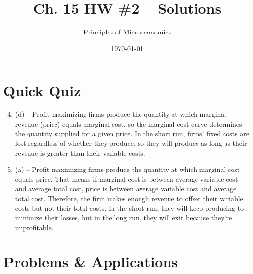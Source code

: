 \documentclass{article}
\title{Ch. 15 HW \#2 -- Solutions}
\author{Principles of Microeconomics}
\date{\today}
\begin{document}
\maketitle

\section*{Quick Quiz}

\begin{enumerate}

\setcounter{enumi}{3}
\item (d) -- Profit maximizing firms produce the quantity at which marginal revenue (price) equals marginal cost, so the marginal cost curve determines the quantity supplied for a given price. In the short run, firms' fixed costs are lost regardless of whether they produce, so they will produce as long as their revenue is greater than their variable costs. 

\item (a) -- Profit maximizing firms produce the quantity at which marginal cost equals price. That means if marginal cost is between average variable cost and average total cost, price is between average variable cost and average total cost. Therefore, the firm makes enough revenue to offset their variable costs but not their total costs. In the short run, they will keep producing to minimize their losses, but in the long run, they will exit because they're unprofitable.

\end{enumerate}

\section*{Problems \& Applications}
\end{document}
